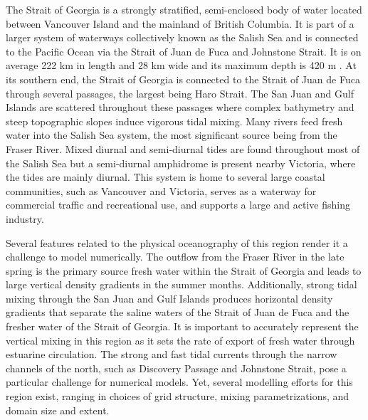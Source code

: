 \documentclass[pdftex,10pt]{article}
\begin{document}
The Strait of Georgia is a strongly stratified, semi-enclosed body of water located between Vancouver Island and the mainland of British Columbia. It is part of a larger system of waterways collectively known as the Salish Sea and is connected to the Pacific Ocean via the Strait of Juan de Fuca and Johnstone Strait. It is on average 222 km in length and 28 km wide and its maximum depth is 420 m \citep{thomson1981oceanography}. At its southern end, the Strait of Georgia is connected to the Strait of Juan de Fuca through several passages, the largest being Haro Strait. The San Juan and Gulf Islands are scattered throughout these passages where complex bathymetry and steep topographic slopes induce vigorous tidal mixing. Many rivers feed fresh water into the Salish Sea system, the most significant source being from the Fraser River. Mixed diurnal and semi-diurnal tides are found throughout most of the Salish Sea but a semi-diurnal amphidrome is present nearby Victoria, where the tides are mainly diurnal. This system is home to several large coastal communities, such as Vancouver and Victoria, serves as a waterway for commercial traffic and recreational use, and supports a large and active fishing industry.   

Several features related to the physical oceanography of this region render it a challenge to model numerically. The outflow from the Fraser River in the late spring is the primary source fresh water within the Strait of Georgia and leads to large vertical density gradients in the summer months. Additionally, strong tidal mixing through the San Juan and Gulf Islands produces horizontal density gradients that separate the saline waters of the Strait of Juan de Fuca and the fresher water of the Strait of Georgia. It is important to accurately represent the vertical mixing in this region as it sets the rate of export of fresh water through estuarine circulation. The strong and fast tidal currents through the narrow channels of the north, such as Discovery Passage and Johnstone Strait, pose a particular challenge for numerical models. Yet, several modelling efforts for this region exist, ranging in choices of grid structure, mixing parametrizations, and domain size and extent. 
\end{document}
